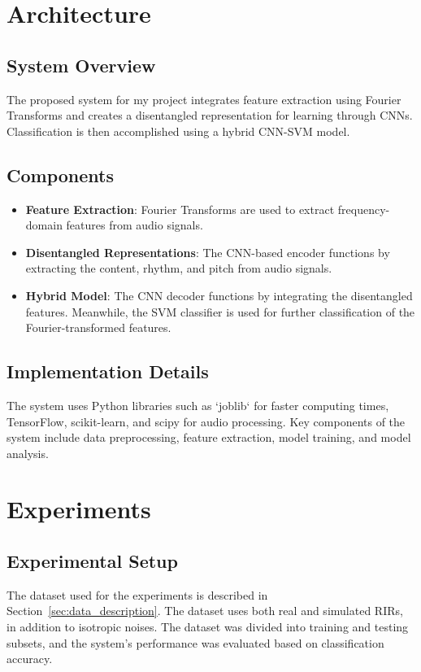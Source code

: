 \documentclass{article}
\begin{document}
\section{Architecture}
\subsection{System Overview}
The proposed system for my project integrates feature extraction using Fourier Transforms and creates a disentangled representation for learning through CNNs. Classification is then accomplished using a hybrid CNN-SVM model.

\subsection{Components}
\begin{itemize}
  \item \textbf{Feature Extraction}: Fourier Transforms are used to extract frequency-domain features from audio signals.
  \item \textbf{Disentangled Representations}: The CNN-based encoder functions by extracting the content, rhythm, and pitch from audio signals.
  \item \textbf{Hybrid Model}: The CNN decoder functions by integrating the disentangled features. Meanwhile, the SVM classifier is used for further classification of the Fourier-transformed features.
\end{itemize}

\subsection{Implementation Details}
The system uses Python libraries such as `joblib` for faster computing times, TensorFlow, scikit-learn, and scipy for audio processing. Key components of the system include data preprocessing, feature extraction, model training, and model analysis.

\section{Experiments}
\subsection{Experimental Setup}
The dataset used for the experiments is described in Section~\ref{sec:data_description}. The dataset uses both real and simulated RIRs, in addition to isotropic noises. The dataset was divided into training and testing subsets, and the system's performance was evaluated based on classification accuracy.
\end{document}
